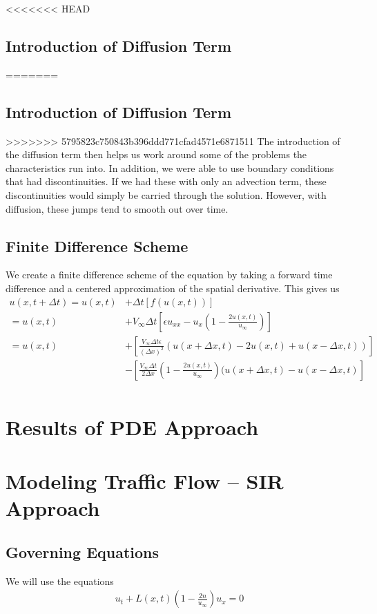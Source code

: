 \documentclass[12pt]{article}
\begin{document}
<<<<<<< HEAD
	\subsection{Introduction of Diffusion Term}
=======
\subsection{Introduction of Diffusion Term}
>>>>>>> 5795823c750843b396ddd771cfad4571e6871511
The introduction of the diffusion term then helps us work around some of the problems the characteristics run into. In addition, we were able to use boundary conditions that had discontinuities. If we had these with only an advection term, these discontinuities would simply be carried through the solution. However, with diffusion, these jumps tend to smooth out over time.

\subsection{Finite Difference Scheme}
We create a finite difference scheme of the equation by taking a forward time difference and a centered approximation of the spatial derivative. This gives us
\begin{align*}
u(x,t+\Delta t)=u(x,t)&+\Delta t[f(u(x,t))] \\
=u(x,t)&+V_{\infty}\Delta t\left[\epsilon u_{xx}-u_x\left(1-\frac{2u(x,t)}{u_{\infty}}\right)\right] \\
=u(x,t)&+\left[\frac{V_{\infty}\Delta t\epsilon}{(\Delta x)^2}(u(x+\Delta x, t)-2u(x,t)+u(x-\Delta x,t))\right] \\
&-\left[\frac{V_{\infty}\Delta t}{2\Delta x}\left(1-\frac{2u(x,t)}{u_{\infty}}\right)(u(x+\Delta x,t)-u(x-\Delta x,t)\right] \\
\end{align*}
\section{Results of PDE Approach}

\section{Modeling Traffic Flow – SIR Approach}

\subsection{Governing Equations} 
We will use the equations 
\begin{align*}
    u_t + L(x, t) ( 1 - \frac{2n}{u_\infty} ) u_x = 0 
\end{align*}
\end{document}
